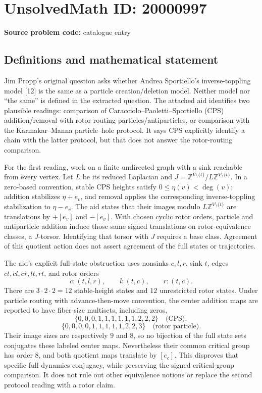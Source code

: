 \documentclass[11pt]{article}
\newcommand{\Z}{\mathbb{Z}}
\begin{document}
\section*{UnsolvedMath ID: 20000997}
\textbf{Source problem code:} catalogue entry
\subsection{Definitions and mathematical statement}
Jim Propp's original question asks whether Andrea Sportiello's inverse-toppling model [12] is the same as a particle creation/deletion model. Neither model nor ``the same'' is defined in the extracted question. The attached aid identifies two plausible readings: comparison of Caracciolo--Paoletti--Sportiello (CPS) addition/removal with rotor-routing particles/antiparticles, or comparison with the Karmakar--Manna particle--hole protocol. It says CPS explicitly identify a chain with the latter protocol, but that does not answer the rotor-routing comparison.

For the first reading, work on a finite undirected graph with a sink reachable from every vertex. Let $L$ be its reduced Laplacian and $J=\Z^{V\setminus\{t\}}/L\Z^{V\setminus\{t\}}$. In a zero-based convention, stable CPS heights satisfy $0\le\eta(v)<\deg(v)$; addition stabilizes $\eta+e_v$, and removal applies the corresponding inverse-toppling stabilization to $\eta-e_v$. The aid states that their images modulo $L\Z^{V\setminus\{t\}}$ are translations by $+[e_v]$ and $-[e_v]$. With chosen cyclic rotor orders, particle and antiparticle addition induce those same signed translations on rotor-equivalence classes, a $J$-torsor. Identifying that torsor with $J$ requires a base class. Agreement of this quotient action does not assert agreement of the full states or trajectories.

The aid's explicit full-state obstruction uses nonsinks $c,l,r$, sink $t$, edges $ct,cl,cr,lt,rt$, and rotor orders
\[
c:(t,l,r),\qquad l:(t,c),\qquad r:(t,c).
\]
There are $3\cdot2\cdot2=12$ stable-height states and $12$ unrestricted rotor states. Under particle routing with advance-then-move convention, the center addition maps are reported to have fiber-size multisets, including zeros,
\[
\{0,0,0,1,1,1,1,1,1,2,2,2\}\quad\text{(CPS)},
\]
\[
\{0,0,0,0,1,1,1,1,1,2,2,3\}\quad\text{(rotor particle)}.
\]
Their image sizes are respectively $9$ and $8$, so no bijection of the full state sets conjugates these labeled center maps. Nevertheless their common critical group has order $8$, and both quotient maps translate by $[e_c]$. This disproves that specific full-dynamics conjugacy, while preserving the signed critical-group comparison. It does not rule out other equivalence notions or replace the second protocol reading with a rotor claim.
\end{document}
